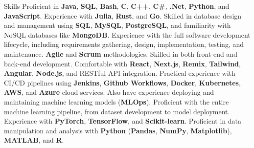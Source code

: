\begin{rubric}{Skills}
    Proficient in \textbf{Java}, \textbf{SQL}, \textbf{Bash}, \textbf{C}, \textbf{C++}, \textbf{C\#}, \textbf{.Net}, \textbf{Python}, and \textbf{JavaScript}. Experience with \textbf{Julia}, \textbf{Rust}, and \textbf{Go}.
    Skilled in database design and management using \textbf{SQL}, \textbf{MySQL}, \textbf{PostgreSQL}, and familiarity with NoSQL databases like \textbf{MongoDB}.
    Experience with the full software development lifecycle, including requirements gathering, design, implementation, testing, and maintenance. \textbf{Agile} and \textbf{Scrum} methodologies.
    Skilled in both front-end and back-end development. Comfortable with \textbf{React}, \textbf{Next.js}, \textbf{Remix}, \textbf{Tailwind}, \textbf{Angular}, \textbf{Node.js}, and RESTful API integration.
    Practical experience with CI/CD pipelines using \textbf{Jenkins}, \textbf{Github Workflows}, \textbf{Docker}, \textbf{Kubernetes}, \textbf{AWS}, and \textbf{Azure} cloud services. Also have experience deploying and maintaining machine learning models (\textbf{MLOps}).
    Proficient with the entire machine learning pipeline, from dataset development to model deployment. Experience with \textbf{PyTorch}, \textbf{TensorFlow}, and \textbf{Scikit-learn}.
    Proficient in data manipulation and analysis with \textbf{Python} (\textbf{Pandas}, \textbf{NumPy}, \textbf{Matplotlib}), \textbf{MATLAB}, and \textbf{R}.
\end{rubric}
